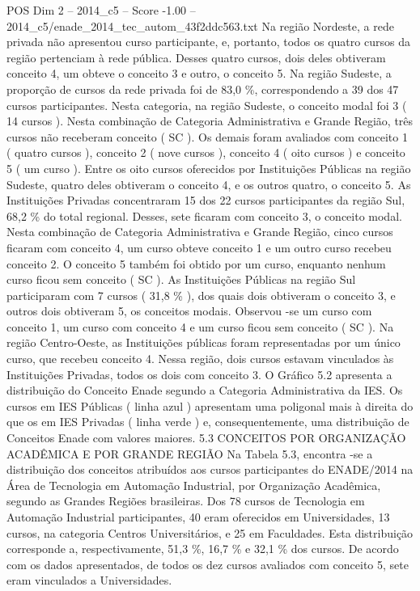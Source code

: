 \begin{textsample}{POS Dim 2 – 2014\_c5 – Score -1.00 – 2014\_c5/enade\_2014\_tec\_autom\_43f2ddc563.txt}
Na região Nordeste, a rede privada não apresentou curso participante, e, portanto, todos os quatro cursos da região pertenciam à rede pública.
Desses quatro cursos, dois deles obtiveram conceito 4, um obteve o conceito 3 e outro, o conceito 5.
Na região Sudeste, a proporção de cursos da rede privada foi de 83,0 \%, correspondendo a 39 dos 47 cursos participantes.
Nesta categoria, na região Sudeste, o conceito modal foi 3 ( 14 cursos ).
Nesta combinação de Categoria Administrativa e Grande Região, três cursos não receberam conceito ( SC ).
Os demais foram avaliados com conceito 1 ( quatro cursos ), conceito 2 ( nove cursos ), conceito 4 ( oito cursos ) e conceito 5 ( um curso ).
Entre os oito cursos oferecidos por Instituições Públicas na região Sudeste, quatro deles obtiveram o conceito 4, e os outros quatro, o conceito 5.
As Instituições Privadas concentraram 15 dos 22 cursos participantes da região Sul, 68,2 \% do total regional.
Desses, sete ficaram com conceito 3, o conceito modal.
Nesta combinação de Categoria Administrativa e Grande Região, cinco cursos ficaram com conceito 4, um curso obteve conceito 1 e um outro curso recebeu conceito 2.
O conceito 5 também foi obtido por um curso, enquanto nenhum curso ficou sem conceito ( SC ).
As Instituições Públicas na região Sul participaram com 7 cursos ( 31,8 \% ), dos quais dois obtiveram o conceito 3, e outros dois obtiveram 5, os conceitos modais.
Observou -se um curso com conceito 1, um curso com conceito 4 e um curso ficou sem conceito ( SC ).
Na região Centro-Oeste, as Instituições públicas foram representadas por um único curso, que recebeu conceito 4.
Nessa região, dois cursos estavam vinculados às Instituições Privadas, todos os dois com conceito 3.
O Gráfico 5.2 apresenta a distribuição do Conceito Enade segundo a Categoria Administrativa da IES.
Os cursos em IES Públicas ( linha azul ) apresentam uma poligonal mais à direita do que os em IES Privadas ( linha verde ) e, consequentemente, uma distribuição de Conceitos Enade com valores maiores. 5.3 CONCEITOS POR ORGANIZAÇÃO ACADÊMICA E POR GRANDE REGIÃO Na Tabela 5.3, encontra -se a distribuição dos conceitos atribuídos aos cursos participantes do ENADE/2014 na Área de Tecnologia em Automação Industrial, por Organização Acadêmica, segundo as Grandes Regiões brasileiras.
Dos 78 cursos de Tecnologia em Automação Industrial participantes, 40 eram oferecidos em Universidades, 13 cursos, na categoria Centros Universitários, e 25 em Faculdades.
Esta distribuição corresponde a, respectivamente, 51,3 \%, 16,7 \% e 32,1 \% dos cursos.
De acordo com os dados apresentados, de todos os dez cursos avaliados com conceito 5, sete eram vinculados a Universidades.

\end{textsample}
